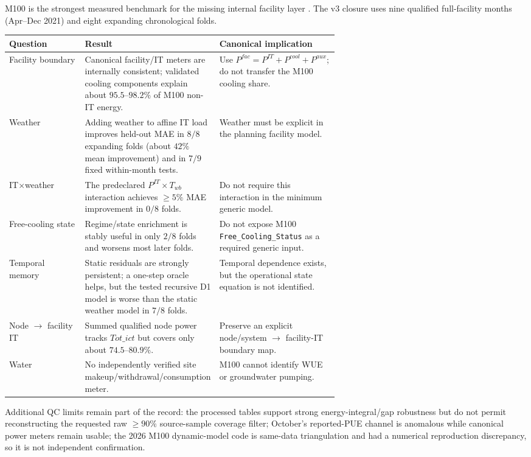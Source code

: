 \documentclass[11pt]{article}
\begin{document}
M100 is the strongest measured benchmark for the missing internal facility layer \cite{m100}. The v3 closure uses nine qualified full-facility months (Apr--Dec 2021) and eight expanding chronological folds.

\begin{center}
\scriptsize
\begin{tabularx}{\linewidth}{@{}p{0.23\linewidth}p{0.40\linewidth}Y@{}}
\toprule
\textbf{Question} & \textbf{Result} & \textbf{Canonical implication} \\
\midrule
Facility boundary & Canonical facility/IT meters are internally consistent; validated cooling components explain about $95.5$--$98.2\%$ of M100 non-IT energy. & Use $P^{fac}=P^{IT}+P^{cool}+P^{aux}$; do not transfer the M100 cooling share. \\
Weather & Adding weather to affine IT load improves held-out MAE in $8/8$ expanding folds (about $42\%$ mean improvement) and in $7/9$ fixed within-month tests. & Weather must be explicit in the planning facility model. \\
IT$\times$weather & The predeclared $P^{IT}\times T_{wb}$ interaction achieves $\ge5\%$ MAE improvement in $0/8$ folds. & Do not require this interaction in the minimum generic model. \\
Free-cooling state & Regime/state enrichment is stably useful in only $2/8$ folds and worsens most later folds. & Do not expose M100 \texttt{Free\_Cooling\_Status} as a required generic input. \\
Temporal memory & Static residuals are strongly persistent; a one-step oracle helps, but the tested recursive D1 model is worse than the static weather model in $7/8$ folds. & Temporal dependence exists, but the operational state equation is not identified. \\
Node $\rightarrow$ facility IT & Summed qualified node power tracks $Tot\_ict$ but covers only about $74.5$--$80.9\%$. & Preserve an explicit node/system $\rightarrow$ facility-IT boundary map. \\
Water & No independently verified site makeup/withdrawal/consumption meter. & M100 cannot identify WUE or groundwater pumping. \\
\bottomrule
\end{tabularx}
\end{center}

Additional QC limits remain part of the record: the processed tables support strong energy-integral/gap robustness but do not permit reconstructing the requested raw $\ge90\%$ source-sample coverage filter; October's reported-PUE channel is anomalous while canonical power meters remain usable; the 2026 M100 dynamic-model code is same-data triangulation and had a numerical reproduction discrepancy, so it is not independent confirmation.
\end{document}
